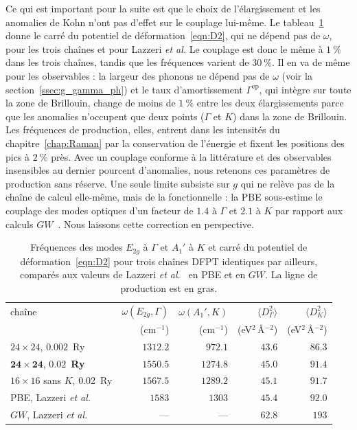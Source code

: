 Ce qui est important pour la suite est que le choix de l'élargissement et les anomalies de Kohn n'ont pas d'effet sur le couplage lui-même. Le tableau~\ref{tab:kohn_chaines} donne le carré du potentiel de déformation~\eqref{eqn:D2}, qui ne dépend pas de $\omega$, pour les trois chaînes et pour Lazzeri \textit{et al.} Le couplage est donc le même à $1~\%$ dans les trois chaînes, tandis que les fréquences varient de $30~\%$. Il en va de même pour les observables : la largeur des phonons ne dépend pas de $\omega$ (voir la section~\ref{ssec:g_gamma_ph}) et le taux d'amortissement $\Gamma^\text{ep}$, qui intègre sur toute la zone de Brillouin, change de moins de $1~\%$ entre les deux élargissements parce que les anomalies n'occupent que deux points ($\Gamma$ et $K$) dans la zone de Brillouin. Les fréquences de production, elles, entrent dans les intensités du chapitre~\ref{chap:Raman} par la conservation de l'énergie et fixent les positions des pics à $2~\%$ près. Avec un couplage conforme à la littérature et des observables insensibles au dernier pourcent d'anomalies, nous retenons ces paramètres de production sans réserve. Une seule limite subsiste sur $g$ qui ne relève pas de la chaîne de calcul elle-même, mais de la fonctionnelle : la PBE sous-estime le couplage des modes optiques d'un facteur de $1.4$ à $\Gamma$ et $2.1$ à $K$ par rapport aux calculs $GW$~\cite{lazzeriImpactElectronelectronCorrelation2008}. Nous laissons cette correction en perspective.
\begin{table}[htbp]
    \centering
    \caption[Fréquences et couplage aux anomalies de Kohn selon la chaîne de calcul.]{Fréquences des modes $E_{2g}$ à $\Gamma$ et $A_1'$ à $K$ et carré du potentiel de déformation~\eqref{eqn:D2} pour trois chaînes DFPT identiques par ailleurs, comparés aux valeurs de Lazzeri \textit{et al.}~\cite{lazzeriImpactElectronelectronCorrelation2008} en PBE et en $GW$. La ligne de production est en gras.}
    \label{tab:kohn_chaines}
    \begin{tabular}{lrrrr}
        \hline\hline
        chaîne & $\omega(E_{2g},\Gamma)$ & $\omega(A_1',K)$ & $\langle D^2_\Gamma\rangle$ & $\langle D^2_K\rangle$ \\
               & (cm$^{-1}$) & (cm$^{-1}$) & (eV$^2$\,\AA$^{-2}$) & (eV$^2$\,\AA$^{-2}$) \\
        \hline
        $24\times 24$, $0.002$~Ry & $1312.2$ & $972.1$ & $43.6$ & $86.3$ \\
        $\mathbf{24\times 24}$, $\mathbf{0.02}$~\textbf{Ry} & $\mathbf{1550.5}$ & $\mathbf{1274.8}$ & $\mathbf{45.0}$ & $\mathbf{91.4}$ \\
        $16\times 16$ sans $K$, $0.02$~Ry & $1567.5$ & $1289.2$ & $45.1$ & $91.7$ \\
        PBE, Lazzeri \textit{et al.} & $1583$ & $1303$ & $45.4$ & $92.0$ \\
        $GW$, Lazzeri \textit{et al.} & --- & --- & $62.8$ & $193$ \\
        \hline\hline
    \end{tabular}
\end{table}

